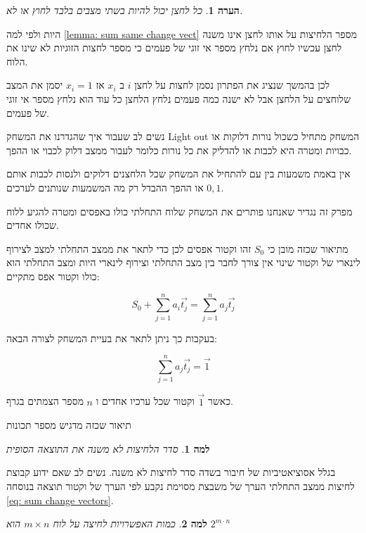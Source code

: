 \documentclass[12pt,twoside]{article}
\newtheorem{lemma}{למה}[section]
\newtheorem{comm}{הערה}[section]
\newcommand{\sumi}[1]{\sum_{#1=1}^n}
\begin{document}
\begin{comm}
    \label{comm: press is uneven presses}
    כל לחצן יכול להיות בשתי מצבים בלבד
    לחוץ או לא.
\end{comm}

היות ולפי למה
\ref{lemma:  sum same change vect}
מספר הלחיצות על אותו לחצן אינו משנה 
לחצן עכשיו 
לחוץ אם נלחץ מספר אי זוגי של פעמים 
כי מספר לחצות הזוגיות לא שינו את הלוח.

לכן בהמשך שנציג את הפתרון נסמן לחצות על לחצן 
$i$
ב
$x_i$
אז 
$x_i = 1$
יסמן את המצב שלוחצים על הלחצן אבל לא ישנה כמה פעמים נלחץ הלחצן 
כל עוד הוא נלחץ מספר אי זוגי של פעמים.

נשים לב שעבור איך שהגדרנו את המשחק 
{Light out}
המשחק מתחיל כשכול
נורות דלוקות או כבויות
ומטרה היא לכבות או להדליק את כל נורות
כלומר לעבור ממצב דלוק לכבוי או ההפך.

אין באמת משמעות בין עם להתחיל את המשחק שכל הלחצנים דלוקים ולנסות לכבות אותם או ההפך ההבדל רק
מה המשמעות שנותנים לערכים
$0 ,1 $.

מפרק זה נגדיר שאנחנו פותרים את המשחק שלוח התחלתי כולו באפסים
ומטרה להגיע ללוח שכולו אחדים.

מתיאור שכזה מובן כי 
$S_0$
זהו וקטור אפסים לכן כדי לתאר את ממצב התחלתי
למצב לצירוף לינארי של וקטור שינוי 
אין צורך לחבר בין מצב התחלתי וצירוף לינארי
היות ומצב התחלתי הוא כולו וקטור אפס
מתקיים:

\begin{equation}
    \label{eq: sum change vectors}
    S_0 + \sumi{j} a_i \vec{t_j} =  \sumi{j} a_j \vec{t_j}
\end{equation}

בעקבות כך ניתן לתאר את בעיית המשחק לצורה הבאה:

\begin{equation}
    \label{eq: lin eq for solving problem}
    \sumi{j} a_j \vec{t_j} = \vec{1}
\end{equation}

כאשר
$\vec{1}$
וקטור שכל ערכיו אחדים
ו
$n$
מספר הצמתים בגרף.

תיאור שכזה מדגיש מספר תכונות 

\begin{lemma}
    \label{lemma: order presses}
    סדר הלחיצות לא משנה את התוצאה הסופית
\end{lemma}

בגלל אסוציאטיביות של חיבור בשדה 
סדר לחיצות לא משנה.
נשים לב שאם ידוע קבוצת לחיצות ממצב התחלתי הערך של משבצת מסוימת נקבע לפי 
הערך של וקטור תוצאה
בנוסחה
\ref{eq: sum change vectors}.


\begin{lemma}
    \label{lemma: num presses}
    כמות האפשרויות לחיצה על לוח
    $m \times n$
    הוא 
    $2^{m \cdot n}$
\end{lemma}
\end{document}
